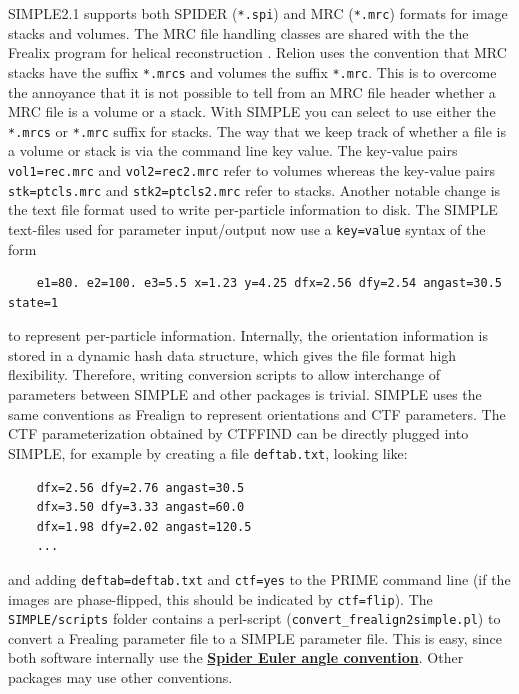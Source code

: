 \documentclass[a4paper,11pt]{article}
\begin{document}
SIMPLE2.1 supports both SPIDER (\texttt{*.spi}) and MRC (\texttt{*.mrc}) formats for image stacks and volumes. The MRC file handling classes are shared with the the Frealix program for helical reconstruction \citep{rohou2014frealix}. Relion \citep{Scheres:2012aa} uses the convention that MRC stacks have the suffix \texttt{*.mrcs} and volumes the suffix \texttt{*.mrc}. This is to overcome the annoyance that it is not possible to tell from an MRC file header whether a MRC file is a volume or a stack. With SIMPLE you can select to use either the \texttt{*.mrcs} or \texttt{*.mrc} suffix for stacks. The way that we keep track of whether a file is a volume or stack is via the command line key value. The key-value pairs \texttt{vol1=rec.mrc} and \texttt{vol2=rec2.mrc} refer to volumes whereas the key-value pairs \texttt{stk=ptcls.mrc} and \texttt{stk2=ptcls2.mrc} refer to stacks. Another notable change is the text file format used to write per-particle information to disk. The SIMPLE text-files used for parameter input/output now use a \texttt{key=value} syntax of the form
\begin{verbatim}
    e1=80. e2=100. e3=5.5 x=1.23 y=4.25 dfx=2.56 dfy=2.54 angast=30.5 state=1
\end{verbatim}
to represent per-particle information. Internally, the orientation information is stored in a dynamic hash data structure, which gives the file format high flexibility. Therefore, writing conversion scripts to allow interchange of parameters between SIMPLE and other packages is trivial. SIMPLE uses the same conventions as Frealign \citep{Grigorieff:2007aa} to represent orientations and CTF parameters. The CTF parameterization obtained by CTFFIND \citep{Mindell:2003aa} can be directly plugged into SIMPLE, for example by creating a file \texttt{deftab.txt}, looking like:
\begin{verbatim}
    dfx=2.56 dfy=2.76 angast=30.5
    dfx=3.50 dfy=3.33 angast=60.0
    dfx=1.98 dfy=2.02 angast=120.5
    ...
\end{verbatim}
and adding \texttt{deftab=deftab.txt} and \texttt{ctf=yes} to the PRIME command line (if the images are phase-flipped, this should be indicated by \texttt{ctf=flip}). The \texttt{SIMPLE/scripts} folder contains a perl-script (\texttt{convert\_frealign2simple.pl}) to convert a Frealing parameter file to a SIMPLE parameter file. This is easy, since both software internally use the \href{http://spider.wadsworth.org/spider_doc/spider/docs/euler.html}{\textbf{\textcolor{BurntOrange}{Spider Euler angle convention}}}. Other packages may use other conventions.
\end{document}
